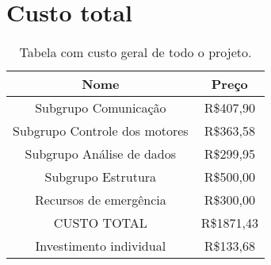 \section{Custo total}

\begin{table}[h]
	\centering
	\label{Custototal}	
	\begin{tabular}{cc}
		\toprule
		\textbf{Nome} & \textbf{Preço}  \\
		\midrule
		Subgrupo Comunicação & R\$407,90 \\
		Subgrupo Controle dos motores & R\$363,58  \\
		Subgrupo Análise de dados & R\$299,95 \\
		Subgrupo Estrutura & R\$500,00  \\
		Recursos de emergência & R\$300,00\\
		CUSTO TOTAL & R\$1871,43 \\
		Investimento individual & R\$133,68 \\
		\bottomrule
	\end{tabular}	
	\caption{Tabela com custo geral de todo o projeto.}
\end{table}
